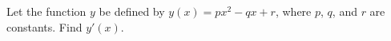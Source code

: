 Let the function $y$ be defined by $y(x)=px^2-qx+r$, where $p$, $q$, and $r$
are constants. Find $y'(x)$.\answercheck
